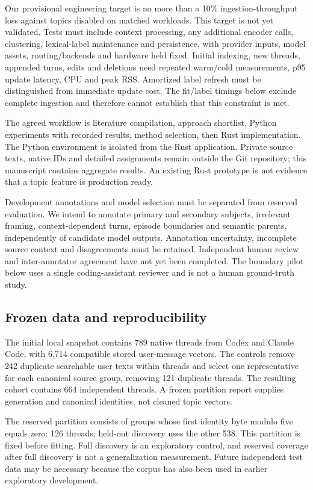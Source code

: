 \documentclass[11pt]{article}
\begin{document}
Our provisional engineering target is no more than a 10\% ingestion-throughput
loss against topics disabled on matched workloads. This target is not yet
validated. Tests must include context processing, any additional encoder calls,
clustering, lexical-label maintenance and persistence, with provider inputs,
model assets, routing/backends and hardware held fixed. Initial indexing, new
threads, appended turns, edits and deletions need repeated warm/cold measurements,
p95 update latency, CPU and peak RSS. Amortized label refresh must be distinguished
from immediate update cost. The fit/label timings below exclude complete ingestion
and therefore cannot establish that this constraint is met.

The agreed workflow is literature compilation, approach shortlist, Python
experiments with recorded results, method selection, then Rust implementation.
The Python environment is isolated from the Rust application. Private source
texts, native IDs and detailed assignments remain outside the Git repository;
this manuscript contains aggregate results. An existing Rust prototype is not
evidence that a topic feature is production ready.

Development annotations and model selection must be separated from reserved
evaluation. We intend to annotate primary and secondary subjects, irrelevant
framing, context-dependent turns, episode boundaries and semantic parents,
independently of candidate model outputs. Annotation uncertainty, incomplete
source context and disagreements must be retained. Independent human review and
inter-annotator agreement have not yet been completed. The boundary pilot below
uses a single coding-assistant reviewer and is not a human ground-truth study.

\subsection{Frozen data and reproducibility}
The initial local snapshot contains 789 native threads from Codex and Claude
Code, with 6,714 compatible stored user-message vectors. The controls remove 242
duplicate searchable user texts within threads and select one representative
for each canonical source group, removing 121 duplicate threads. The resulting
cohort contains 664 independent threads. A frozen partition report supplies
generation and canonical identities, not cleaned topic vectors.

The reserved partition consists of groups whose first identity byte modulo five
equals zero: 126 threads; held-out discovery uses the other 538. This partition
is fixed before fitting. Full discovery is an exploratory control, and reserved
coverage after full discovery is not a generalization measurement. Future
independent test data may be necessary because the corpus has also been used in
earlier exploratory development.
\end{document}
